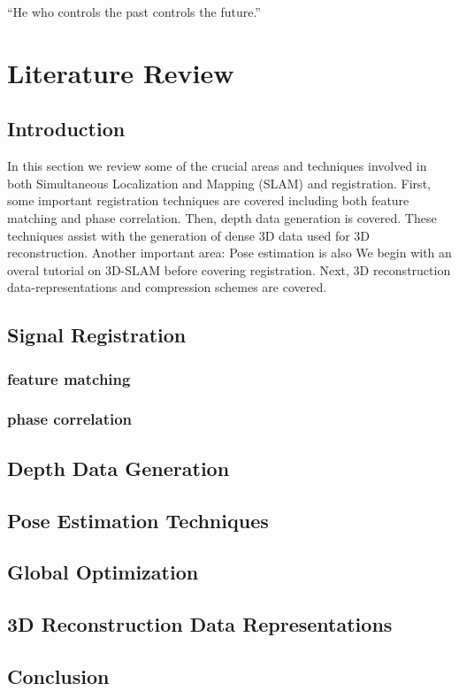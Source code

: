 \begin{savequote}[8cm]
  ``He who controls the past controls the future.''
\end{savequote}
\makeatletter
\chapter{Literature Review}

\section{Introduction}

In this section we review some of the crucial areas and techniques involved in both Simultaneous Localization and Mapping (SLAM) and registration. First, some important registration techniques are covered including both feature matching and phase correlation. Then, depth data generation is covered. These techniques assist with the generation of dense 3D data used for 3D reconstruction. Another important area: Pose estimation is also We begin with an overal tutorial on 3D-SLAM before covering registration. Next, 3D reconstruction data-representations and compression schemes are covered. 


\section{Signal Registration}
\subsection{feature matching}

\subsection{phase correlation}


\section{Depth Data Generation} \label{DepthDataGenSection}

\section{Pose Estimation Techniques}

\section{Global Optimization}


\section{3D Reconstruction Data Representations}




\section{Conclusion}

